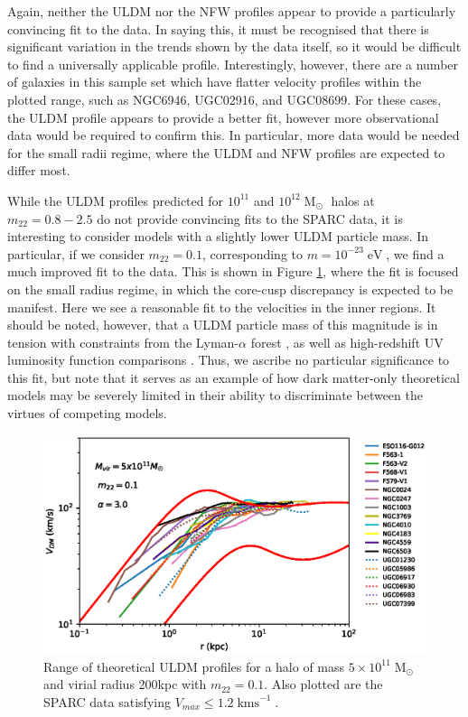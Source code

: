 \documentclass[a4paper,11pt]{article}
\begin{document}
Again, neither the ULDM nor the NFW profiles appear to provide a particularly convincing fit to the data. In saying this, it must be recognised that there is significant variation in the trends shown by the data itself, so it would be difficult to find a universally applicable profile. Interestingly, however, there are a number of galaxies in this sample set which have flatter velocity profiles within the plotted range, such as NGC6946, UGC02916, and UGC08699. For these cases, the ULDM profile appears to provide a better fit, however more observational data would be required to confirm this. In particular, more data would be needed for the small radii regime, where the ULDM and NFW profiles are expected to differ most. 

While the ULDM profiles predicted for $10^{11}$ and $10^{12} \operatorname{M}_{\odot}$ halos at $m_{22} = 0.8 - 2.5$ do not provide convincing fits to  the SPARC data, it is interesting to consider models with a slightly lower ULDM particle mass. In particular, if we consider $m_{22} = 0.1$, corresponding to $m = 10^{-23} \operatorname{eV}$, we find a much improved fit to the data. This is shown in Figure \ref{fig:velocity_23}, where the fit is focused on the small radius regime, in which the core-cusp discrepancy is expected to be manifest. Here we see a reasonable fit to the velocities in the inner regions. It should be noted, however, that a ULDM particle mass of this magnitude is in tension with constraints from the Lyman-$\alpha$ forest \cite{Amendola:2005ad}, as well as high-redshift UV luminosity function comparisons \cite{Bozek:2014uqa}. Thus, we ascribe no particular significance to this fit, but note that it serves as an example of how dark matter-only theoretical models may be severely limited in their ability to discriminate between the virtues of competing models.


\begin{figure}
\centering
\includegraphics[scale = 0.7, trim={0cm 2.5cm 1cm 0.35cm}]{pics/best_match.eps} 
\caption{Range of theoretical ULDM profiles for a halo of mass $5\times 10^{11}\operatorname{M}_{\odot}$ and virial radius 200kpc with $m_{22} = 0.1$. Also plotted are the SPARC data satisfying $V_{max}\leq 1.2 \operatorname{kms}^{-1}$. }\label{fig:velocity_23}
\end{figure}
\end{document}
